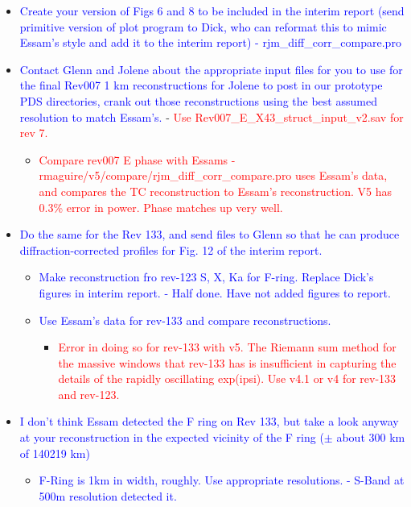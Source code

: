 \documentclass[crop=false,class=article,oneside]{standalone}
\begin{document}
\begin{itemize}
    \item \textcolor{blue}{Create your version of Figs 6 and 8 to be included in the interim report (send primitive version of plot program to Dick, who can reformat this to mimic Essam’s style and add it to the interim report) - rjm\_diff\_corr\_compare.pro}
    \item \textcolor{blue}{Contact Glenn and Jolene about the appropriate input files for you to use for the final Rev007 1 km reconstructions for Jolene to post in our prototype PDS directories, crank out those reconstructions using the best assumed resolution to match Essam's.} - \textcolor{red}{Use Rev007\_E\_X43\_struct\_input\_v2.sav for rev 7.}
    \begin{itemize}
        \item \textcolor{red}{Compare rev007 E phase with Essams - rmaguire/v5/compare/rjm\_diff\_corr\_compare.pro uses Essam’s data, and compares the TC reconstruction to Essam’s reconstruction. V5 has 0.3\% error in power. Phase matches up very well.}
    \end{itemize}
    \item \textcolor{blue}{Do the same for the Rev 133, and send files to Glenn so that he can produce diffraction-corrected profiles for Fig. 12 of the interim report.}
    \begin{itemize}
        \item \textcolor{blue}{Make reconstruction fro rev-123 S, X, Ka for F-ring. Replace Dick’s figures in interim report. - Half done. Have not added figures to report.}
        \item \textcolor{blue}{Use Essam’s data for rev-133 and compare reconstructions.}
        \begin{itemize}
            \item \textcolor{red}{Error in doing so for rev-133 with v5. The Riemann sum method for the massive windows that rev-133 has is insufficient in capturing the details of the rapidly oscillating exp(ipsi). Use v4.1 or v4 for rev-133 and rev-123.}
        \end{itemize}
    \end{itemize}
    \item \textcolor{blue}{I don't think Essam detected the F ring on Rev 133, but take a look anyway at your reconstruction in the expected vicinity of the F ring ($\pm$ about 300 km of 140219 km)}
    \begin{itemize}
        \item \textcolor{blue}{F-Ring is 1km in width, roughly. Use appropriate resolutions. - S-Band at 500m resolution detected it.}

\end{itemize}
\end{itemize}
\end{document}
